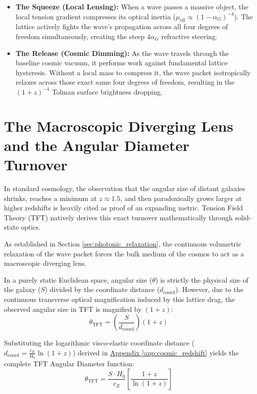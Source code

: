 \begin{itemize}
    \item \textbf{The Squeeze (Local Lensing):} When a wave passes a massive object, the local tension gradient compresses its optical inertia ($\mu_{\text{eff}} \propto (1-\alpha_G)^{-4}$). The lattice actively fights the wave's propagation across all four degrees of freedom simultaneously, creating the steep $4\alpha_G$ refractive steering.
    \item \textbf{The Release (Cosmic Dimming):} As the wave travels through the baseline cosmic vacuum, it performs work against fundamental lattice hysteresis. Without a local mass to compress it, the wave packet isotropically relaxes across those exact same four degrees of freedom, resulting in the $(1+z)^{-4}$ Tolman surface brightness dropping.
\end{itemize}

\section{The Macroscopic Diverging Lens and the Angular Diameter Turnover}
\label{sec:angular_diameter_turnover}

In standard cosmology, the observation that the angular size of distant galaxies shrinks, reaches a minimum at $z \approx 1.5$, and then paradoxically grows larger at higher redshifts is heavily cited as proof of an expanding metric. Tension Field Theory (TFT) natively derives this exact turnover mathematically through solid-state optics.

As established in Section \ref{sec:photonic_relaxation}, the continuous volumetric relaxation of the wave packet forces the bulk medium of the cosmos to act as a macroscopic diverging lens. 

In a purely static Euclidean space, angular size ($\theta$) is strictly the physical size of the galaxy ($S$) divided by the coordinate distance ($d_{\text{coord}}$). However, due to the continuous transverse optical magnification induced by this lattice drag, the observed angular size in TFT is magnified by $(1+z)$:
\[
\theta_{\text{TFT}} = \left( \frac{S}{d_{\text{coord}}} \right) (1+z)
\]

Substituting the logarithmic visco-elastic coordinate distance ($d_{\text{coord}} = \frac{c_E}{H_0} \ln(1+z)$) derived in \hyperref[app:cosmic_redshift]{Appendix \ref*{app:cosmic_redshift}} yields the complete TFT Angular Diameter function:
\[
\theta_{\text{TFT}} = \frac{S \cdot H_0}{c_E} \left[ \frac{1+z}{\ln(1+z)} \right]
\]

